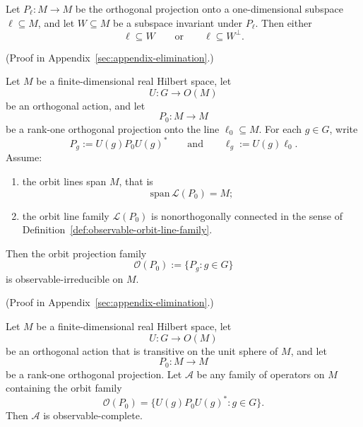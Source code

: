 \begin{lemma}
\label{lem:rank-one-projection-invariant-subspace}
Let $P_{\ell}:M\to M$ be the orthogonal projection onto a one-dimensional
subspace $\ell\subseteq M$, and let $W\subseteq M$ be a subspace invariant
under $P_{\ell}$. Then either
\[
\ell\subseteq W
\qquad\text{or}\qquad
\ell\subseteq W^{\perp}.
\]
\end{lemma}

(Proof in Appendix~\ref{sec:appendix-elimination}.)

\begin{theorem}
\label{thm:connected-rank-one-orbit-irreducible}
Let $M$ be a finite-dimensional real Hilbert space, let
\[
U:G\to O(M)
\]
be an orthogonal action, and let
\[
P_0:M\to M
\]
be a rank-one orthogonal projection onto the line $\ell_0\subseteq M$. For
each $g\in G$, write
\[
P_g:=U(g)P_0U(g)^*
\qquad\text{and}\qquad
\ell_g:=U(g)\ell_0.
\]
Assume:
\begin{enumerate}[label=(\roman*), leftmargin=2em, itemsep=0.2em]
\item the orbit lines span $M$, that is
      \[
      \mathrm{span}\,\mathcal L(P_0)=M;
      \]
\item the orbit line family $\mathcal L(P_0)$ is nonorthogonally connected in
      the sense of Definition~\ref{def:observable-orbit-line-family}.
\end{enumerate}
Then the orbit projection family
\[
\mathcal O(P_0):=\{P_g : g\in G\}
\]
is observable-irreducible on $M$.
\end{theorem}

(Proof in Appendix~\ref{sec:appendix-elimination}.)

\begin{corollary}
\label{cor:sphere-transitive-orbit-observable-completeness}
Let $M$ be a finite-dimensional real Hilbert space, let
\[
U:G\to O(M)
\]
be an orthogonal action that is transitive on the unit sphere of $M$, and let
\[
P_0:M\to M
\]
be a rank-one orthogonal projection. Let $\mathcal A$ be any family of
operators on $M$ containing the orbit family
\[
\mathcal O(P_0)=\{U(g)P_0U(g)^* : g\in G\}.
\]
Then $\mathcal A$ is observable-complete.
\end{corollary}

